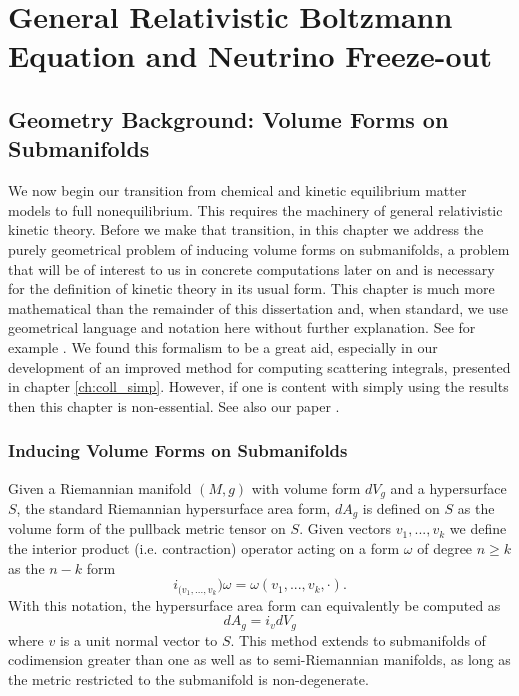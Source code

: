 \part{General Relativistic Boltzmann Equation and Neutrino Freeze-out }
\chapter{Geometry Background: Volume Forms on Submanifolds}\label{ch:vol_forms}
We now begin our transition from chemical and kinetic equilibrium matter models to full nonequilibrium.  This requires the machinery of general relativistic kinetic theory.  Before we make that transition, in this chapter we address the purely geometrical problem of inducing volume forms on submanifolds, a problem that will be of interest to us in concrete computations later on and is necessary for the definition of kinetic theory in its usual form. This chapter is much more mathematical than the remainder of this dissertation and, when standard, we use geometrical language and notation here without further explanation.  See for example \cite{lee2003introduction,lee1997riemannian}.  We found this formalism to be a great aid, especially in our development of an improved method for computing scattering integrals, presented in chapter \ref{ch:coll_simp}.  However, if one is content with simply using the results then this chapter is non-essential. See also our paper \cite{Birrell:2014uka}.



\section{Inducing Volume Forms on Submanifolds}

Given a Riemannian manifold $(M,g)$ with volume form $dV_g$ and a  hypersurface $S$, the standard Riemannian hypersurface area form, $dA_g$ is defined on $S$ as the volume form of the pullback metric tensor on $S$.   Given vectors $v_1,...,v_k$ we define the interior product (i.e. contraction)  operator acting on a form $\omega$ of degree $n\geq k$ as the $n-k$ form 
\begin{equation}
i_{(v_1,...,v_k})\omega=\omega(v_1,...,v_k,\cdot).
\end{equation}
 With this notation, the hypersurface area form can equivalently be computed as
\begin{equation}
dA_g=i_v dV_g
\end{equation}
where $v$ is a unit normal vector to $S$.  This method extends to submanifolds of codimension greater than one as well as to semi-Riemannian manifolds, as long as the metric restricted to the submanifold is non-degenerate. 

